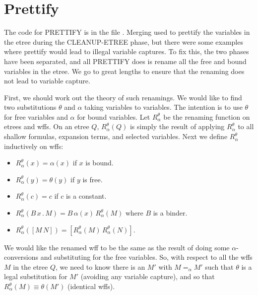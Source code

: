 \section{Prettify}\label{prettify}

The code for PRETTIFY is in the file {\it{}}.
Merging used to prettify the variables in the etree during the CLEANUP-ETREE
phase, but there were some examples where prettify would lead to illegal
variable captures.  To fix this, the two phases have been separated,
and all PRETTIFY does is rename all the free and bound variables in the etree.
We go to great lengths to ensure that the renaming does not lead to variable capture.

First, we should work out the theory of such renamings.
We would like to find two substitutions $\theta$ and $\alpha$
taking variables to variables.  The intention is to use $\theta$
for free variables and $\alpha$ for bound variables.  Let $R^\theta_\alpha$
be the renaming function on etrees and wffs.  
On an etree $Q$, $R^\theta_\alpha(Q)$ is simply the result of applying
$R^\theta_\alpha$ to all shallow formulas, expansion terms, and selected variables.
Next we define $R^\theta_\alpha$ inductively on wffs:
\begin{itemize}
\item $R^\theta_\alpha(x) = \alpha(x)$ if $x$ is bound.
\item $R^\theta_\alpha(y) = \theta(y)$ if $y$ is free.
\item $R^\theta_\alpha(c) = c$ if $c$ is a constant.
\item $R^\theta_\alpha(B \, x \, . \, M) = B \, \alpha(x) \, R^\theta_\alpha(M)$
where $B$ is a binder.
\item $R^\theta_\alpha([M\, N]) = [R^\theta_\alpha(M) \, R^\theta_\alpha(N)]$.
\end{itemize}
We would like the renamed wff to be the same as the result of doing some $\alpha$-conversions and
substituting for the free variables.  So, with respect to all the wffs $M$ in the etree $Q$,
we need to know there is an $M'$ with $M =_\alpha M'$ such that $\theta$ is a legal substitution for $M'$
(avoiding any variable capture), and so that $R^\theta_\alpha(M) \equiv \theta(M')$ (identical wffs).

